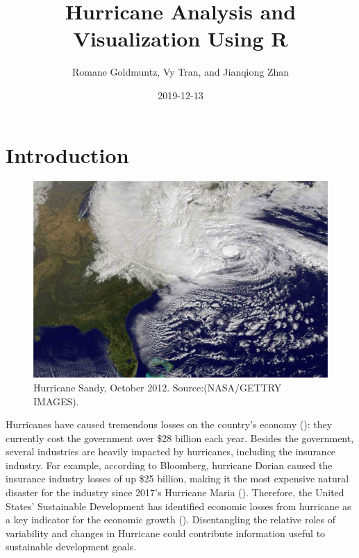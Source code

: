 \documentclass[]{book}
\title{Hurricane Analysis and Visualization Using R}
\author{Romane Goldmuntz, Vy Tran, and Jianqiong Zhan}
\date{2019-12-13}
\begin{document}
\maketitle

{
\setcounter{tocdepth}{1}
\tableofcontents
}
\hypertarget{intro}{%
\chapter{Introduction}\label{intro}}

\begin{figure}
\centering
\includegraphics{../images/sandy-hurricane-1.jpg}
\caption{Hurricane Sandy, October 2012. Source:(NASA/GETTRY IMAGES).}
\end{figure}

Hurricanes have caused tremendous losses on the country's economy (\citet{Winkle2018}): they currently cost the government over \$28 billion each year. Besides the government, several industries are heavily impacted by hurricanes, including the insurance industry. For example, according to Bloomberg, hurricane Dorian caused the insurance industry losses of up \$25 billion, making it the most expensive natural disaster for the industry since 2017's Hurricane Maria (\citet{DSouza2019}). Therefore, the United States' Sustainable Development has identified economic losses from hurricane as a key indicator for the economic growth (\citet{SDG2018}). Disentangling the relative roles of variability and changes in Hurricane could contribute information useful to sustainable development goals.
\end{document}
